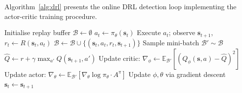Algorithm~\ref{alg:drl} presents the online DRL detection
loop implementing the actor-critic training procedure.

\begin{algorithm}[H]
\caption{DRL-Based Adaptive Detection (\texttt{DRL-Detect})}
\label{alg:drl}
\begin{algorithmic}[1]
\small
{}
  \State Initialise replay buffer $\mathcal{B}\gets\emptyset$
    \State $a_t\gets\pi_\theta(\mathbf{s}_t)$
    \State Execute $a_t$; observe $\mathbf{s}_{t+1}$,
      $r_t\gets R(\mathbf{s}_t,a_t)$
    \State $\mathcal{B}\gets
      \mathcal{B}\cup\{(\mathbf{s}_t,a_t,r_t,
      \mathbf{s}_{t+1})\}$
      \State Sample mini-batch $\mathcal{B}'\sim\mathcal{B}$
      \State $\hat{Q}\gets r+\gamma\max_{a'}
        Q(\mathbf{s}_{t+1},a')$
      \State Update critic: $\nabla_\phi\gets
        \mathbb{E}_{\mathcal{B}'}
        [(Q_\phi(\mathbf{s},a)-\hat{Q})^2]$
      \State Update actor: $\nabla_\theta\gets
        \mathbb{E}_{\mathcal{B}'}
        [\nabla_\theta\log\pi_\theta\cdot A^\pi]$
      \State Update $\phi,\theta$ via gradient descent
    \EndIf
    \State $\mathbf{s}_t\gets\mathbf{s}_{t+1}$
  \EndFor
\EndProcedure
\end{algorithmic}
\end{algorithm}


